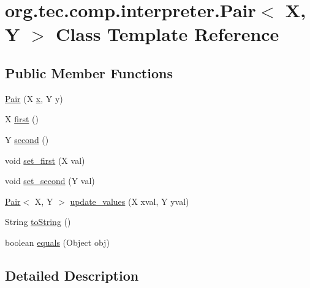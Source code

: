 \hypertarget{classorg_1_1tec_1_1comp_1_1interpreter_1_1_pair}{}\section{org.\+tec.\+comp.\+interpreter.\+Pair$<$ X, Y $>$ Class Template Reference}
\label{classorg_1_1tec_1_1comp_1_1interpreter_1_1_pair}
\subsection*{Public Member Functions}
\begin{DoxyCompactItemize}
\item 
\mbox{\hyperlink{classorg_1_1tec_1_1comp_1_1interpreter_1_1_pair_a3d5b15d07c3d8dacf60cb8bd98a42ea5}{Pair}} (X \mbox{\hyperlink{mqtt__esp8266_8cpp_a6150e0515f7202e2fb518f7206ed97dc}{x}}, Y y)
\item 
X \mbox{\hyperlink{classorg_1_1tec_1_1comp_1_1interpreter_1_1_pair_af445a98ea98d59b5d663f142425111d0}{first}} ()
\item 
Y \mbox{\hyperlink{classorg_1_1tec_1_1comp_1_1interpreter_1_1_pair_af1bd666439ab24fc5e2f99aae8cd548e}{second}} ()
\item 
void \mbox{\hyperlink{classorg_1_1tec_1_1comp_1_1interpreter_1_1_pair_aa9181a26f42700f7db8c4b07423321bd}{set\+\_\+first}} (X val)
\item 
void \mbox{\hyperlink{classorg_1_1tec_1_1comp_1_1interpreter_1_1_pair_a330ca66245c6b75ca8661ace26ee841b}{set\+\_\+second}} (Y val)
\item 
\mbox{\hyperlink{classorg_1_1tec_1_1comp_1_1interpreter_1_1_pair}{Pair}}$<$ X, Y $>$ \mbox{\hyperlink{classorg_1_1tec_1_1comp_1_1interpreter_1_1_pair_a8478f169ef381d47f09b2b7acc2fa3d8}{update\+\_\+values}} (X xval, Y yval)
\item 
String \mbox{\hyperlink{classorg_1_1tec_1_1comp_1_1interpreter_1_1_pair_a41919bd5825de0285bd02a3579bf17da}{to\+String}} ()
\item 
boolean \mbox{\hyperlink{classorg_1_1tec_1_1comp_1_1interpreter_1_1_pair_af010962720e33a5802bc14055adb9c9d}{equals}} (Object obj)
\end{DoxyCompactItemize}


\subsection{Detailed Description}


